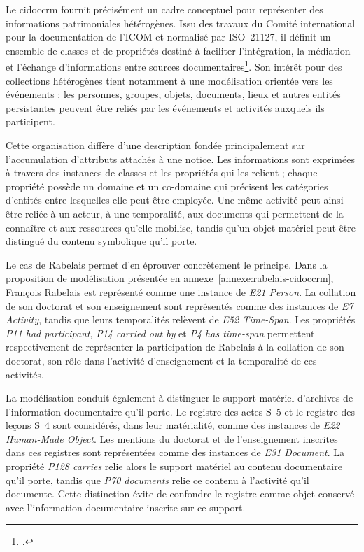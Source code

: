 Le \gls{cidoccrm} fournit précisément un cadre conceptuel pour représenter des informations patrimoniales hétérogènes. Issu des travaux du Comité international pour la documentation de l'ICOM et normalisé par ISO~21127, il définit un ensemble de classes et de propriétés destiné à faciliter l'intégration, la médiation et l'échange d'informations entre sources documentaires\footcite{CIDOCCRM713}. Son intérêt pour des collections hétérogènes tient notamment à une modélisation orientée vers les événements : les personnes, groupes, objets, documents, lieux et autres entités persistantes peuvent être reliés par les événements et activités auxquels ils participent.

Cette organisation diffère d'une description fondée principalement sur l'accumulation d'attributs attachés à une notice. Les informations sont exprimées à travers des instances de classes et les propriétés qui les relient ; chaque propriété possède un domaine et un co-domaine qui précisent les catégories d'entités entre lesquelles elle peut être employée. Une même activité peut ainsi être reliée à un acteur, à une temporalité, aux documents qui permettent de la connaître et aux ressources qu'elle mobilise, tandis qu'un objet matériel peut être distingué du contenu symbolique qu'il porte.

Le cas de Rabelais permet d'en éprouver concrètement le principe. Dans la proposition de modélisation présentée en annexe~\ref{annexe:rabelais-cidoccrm}, François Rabelais est représenté comme une instance de \emph{E21 Person}. La collation de son doctorat et son enseignement sont représentés comme des instances de \emph{E7 Activity}, tandis que leurs temporalités relèvent de \emph{E52 Time-Span}. Les propriétés \emph{P11 had participant}, \emph{P14 carried out by} et \emph{P4 has time-span} permettent respectivement de représenter la participation de Rabelais à la collation de son doctorat, son rôle dans l'activité d'enseignement et la temporalité de ces activités.

La modélisation conduit également à distinguer le support matériel d'archives de l'information documentaire qu'il porte. Le registre des actes S~5 et le registre des leçons S~4 sont considérés, dans leur matérialité, comme des instances de \emph{E22 Human-Made Object}. Les mentions du doctorat et de l'enseignement inscrites dans ces registres sont représentées comme des instances de \emph{E31 Document}. La propriété \emph{P128 carries} relie alors le support matériel au contenu documentaire qu'il porte, tandis que \emph{P70 documents} relie ce contenu à l'activité qu'il documente. Cette distinction évite de confondre le registre comme objet conservé avec l'information documentaire inscrite sur ce support.

